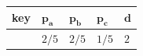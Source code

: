 \begin{center}
\begin{tabular}{|C{2.2cm}|C{2.2cm}|C{2.2cm}|C{2.2cm}|C{2.2cm}|}
\hline
\textbf{key} & $\boldsymbol{p_a}$ & $\boldsymbol{p_b}$ & $\boldsymbol{p_c}$ & $\boldsymbol{d}$ \\ \hline
{} & $2/5$ & $2/5$ & $1/5$ & $2$ \\ \hline
\end{tabular}
\end{center}
